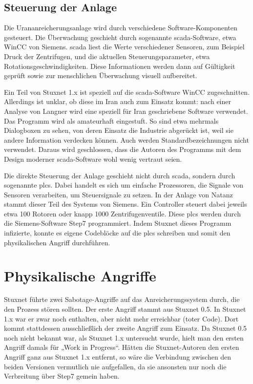 \documentclass[a4paper]{article}
\begin{document}
\subsection{Steuerung der Anlage}

Die Urananreicherungsanlage wird durch verschiedene Software-Komponenten gesteuert.
Die Überwachung geschieht durch sogenannte \gls{scada}-Software, etwa WinCC von Siemens.
\gls{scada} liest die Werte verschiedener Sensoren, zum Beispiel Druck der Zentrifugen,
und die aktuellen Steuerungsparameter, etwa Rotationsgeschwindigkeiten.
Diese Informationen werden dann auf Gültigkeit geprüft sowie zur menschlichen Überwachung visuell aufbereitet.

Ein Teil von Stuxnet 1.x ist speziell auf die \gls{scada}-Software WinCC zugeschnitten.
Allerdings ist unklar, ob diese im Iran auch zum Einsatz kommt:
nach einer Analyse von Langner\cite{tkac} wird eine speziell für Iran geschriebene Software verwendet.
Das Programm wird als amateurhaft eingestuft.
So sind etwa mehrmals Dialogboxen zu sehen, von deren Einsatz die Industrie abgerückt ist, weil sie andere Information verdecken können.
Auch werden Standardbezeichnungen nicht verwendet.
Daraus wird geschlossen, dass die Autoren des Programms mit dem Design moderner \gls{scada}-Software wohl wenig vertraut seien.

Die direkte Steuerung der Anlage geschieht nicht durch \gls{scada}, sondern durch sogenannte \glspl{plc}.
Dabei handelt es sich um einfache Prozessoren, die Signale von Sensoren verarbeiten,
um Steuersignale zu setzen.
In der Anlage von Natanz stammt dieser Teil des Systems von Siemens.
Ein Controller steuert dabei jeweils etwa 100 Rotoren oder knapp 1000 Zentrifugenventile.
Diese \glspl{plc} werden durch die Siemens-Software Step7 programmiert.
Indem Stuxnet dieses Programm infizierte, konnte es eigene Codeblöcke auf die \glspl{plc} schreiben
und somit den physikalischen Angriff durchführen.

\section{Physikalische Angriffe}

Stuxnet führte zwei Sabotage-Angriffe auf das Anreicherungssystem durch, die den Prozess stören sollten.
Der erste Angriff stammt aus Stuxnet 0.5.
In Stuxnet 1.x war er zwar noch enthalten, aber nicht mehr erreichbar (toter Code).
Dort kommt stattdessen ausschließlich der zweite Angriff zum Einsatz.
Da Stuxnet 0.5 noch nicht bekannt war, als Stuxnet 1.x untersucht wurde,
hielt man den ersten Angriff damals für „Work in Progress“.\cite{dossier}
Hätten die Stuxnet-Autoren den ersten Angriff ganz aus Stuxnet 1.x entfernt,
so wäre die Verbindung zwischen den beiden Versionen vermutlich nie aufgefallen,
da sie ansonsten nur noch die Verbreitung über Step7 gemein haben.\cite{05}
\end{document}
